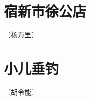 \documentclass[12pt,UTF-8,openany]{ctexbook}
\begin{document}
\vspace{8pt}


\section{宿新市徐公店}

\begin{center}
    \vspace{10pt}
    
    \begin{normalsize}
        
        〔杨万里〕
        
    \end{normalsize}
    
    \vspace{8pt}
    
    \begin{large}
        
        
        
    \end{large}
    
\end{center}

\vspace{8pt}


\section{小儿垂钓}

\begin{center}
    \vspace{10pt}
    
    \begin{normalsize}
        
        〔胡令能〕
        
    \end{normalsize}
    
    \vspace{8pt}
    
    \begin{large}
        
        
        
    \end{large}
    
\end{center}
\end{document}
